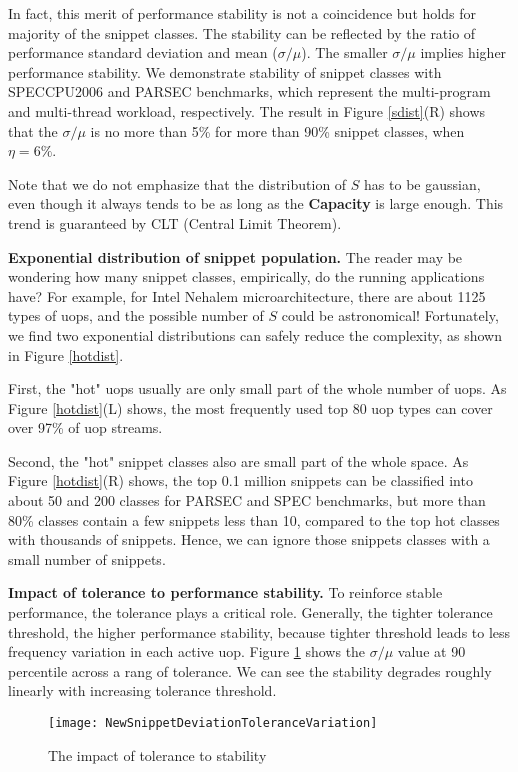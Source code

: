 In fact, this merit of performance stability  is not a coincidence but  holds for majority of the snippet classes.  The stability can be reflected by the ratio of performance standard deviation and mean ($\sigma/\mu$).  The smaller  $\sigma/\mu$ implies higher performance stability.  We demonstrate stability of snippet classes with SPECCPU2006 and PARSEC benchmarks, which represent the multi-program and multi-thread workload, respectively. The result in Figure \ref{sdist}(R) shows that the $\sigma/\mu$ is no more than 5\% for more than 90\% snippet classes, when $\eta=6\%$.

Note that we do not emphasize that the distribution of $S$ has to be gaussian, even though it always tends to be as long as the \textbf{Capacity} is large enough. This trend is guaranteed by CLT (Central Limit Theorem).

\textbf{Exponential distribution of snippet population.} The reader may be wondering how many snippet classes, empirically, do the running applications have?   For example, for Intel Nehalem microarchitecture, there  are about 1125 types of uops, and the possible number of $S$ could be astronomical!   Fortunately, we find two exponential distributions can safely reduce the complexity, as shown in Figure \ref{hotdist}.

First, the "hot" uops usually are only small part of the whole number of uops. As Figure \ref{hotdist}(L) shows, the most frequently used top 80 uop types can cover over 97\% of uop streams.

Second, the "hot" snippet classes also are small part of the whole space. As Figure \ref{hotdist}(R) shows, the top 0.1 million snippets can be classified into about 50 and 200 classes for PARSEC and SPEC benchmarks, but more than 80\% classes contain a few snippets less than 10, compared to the top hot classes with thousands of snippets.  Hence, we can ignore those snippets classes with a small number of snippets.

\textbf{Impact of tolerance to performance stability.} To reinforce stable performance,  the tolerance plays a critical role. Generally, the tighter tolerance threshold, the higher performance stability, because tighter threshold leads to less frequency variation in each active uop. Figure \ref{tolerance} shows the $\sigma/\mu$ value at 90 percentile across a rang of tolerance. We can see the stability degrades roughly linearly with increasing tolerance threshold.

\begin{figure}[t]
  \centering
  \texttt{[image: NewSnippetDeviationToleranceVariation]}\\
  \caption{The impact of tolerance to stability}\label{tolerance}
\end{figure}


